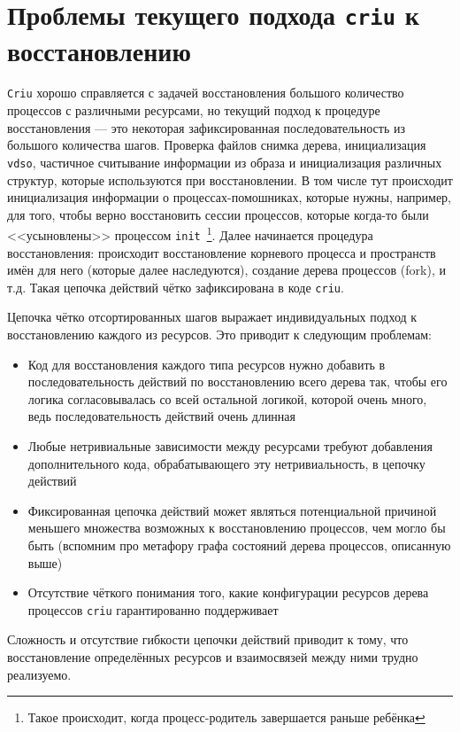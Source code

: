 \section{Проблемы текущего подхода \texttt{criu} к восстановлению}
\label{chap1:sec:problems}

\texttt{Criu} хорошо справляется с задачей восстановления большого количество процессов с различными ресурсами, но
текущий подход к процедуре восстановления --- это некоторая зафиксированная последовательность из большого количества шагов. Проверка файлов снимка дерева, инициализация \texttt{vdso}, частичное считывание информации из образа и инициализация различных структур, которые используются при восстановлении. В том числе тут происходит инициализация информации о процессах-помошниках, которые нужны, например, для того, чтобы верно восстановить сессии процессов, которые когда-то были <<усыновлены>> процессом \texttt{init}~\footnote{Такое происходит, когда процесс-родитель завершается раньше ребёнка}. Далее начинается процедура восстановления: происходит восстановление корневого процесса и пространств имён для него (которые далее наследуются), создание дерева процессов (fork), и т.д. Такая цепочка действий чётко зафиксирована в коде \texttt{criu}.

Цепочка чётко отсортированных шагов выражает индивидуальных подход к восстановлению каждого из ресурсов. Это приводит к следующим проблемам:

\begin{itemize}
	\item Код для восстановления каждого типа ресурсов нужно добавить в последовательность действий по восстановлению всего дерева так, чтобы его логика согласовывалась со всей остальной логикой, которой очень много, ведь последовательность действий очень длинная
	\item Любые нетривиальные зависимости между ресурсами требуют добавления дополнительного кода, обрабатывающего эту нетривиальность, в цепочку действий
	\item Фиксированная цепочка действий может являться потенциальной причиной меньшего множества возможных к восстановлению процессов, чем могло бы быть (вспомним про метафору графа состояний дерева процессов, описанную выше)
	\item Отсутствие чёткого понимания того, какие конфигурации ресурсов дерева процессов \texttt{criu} гарантированно поддерживает
\end{itemize}

Сложность и отсутствие гибкости цепочки действий приводит к тому, что восстановление определённых ресурсов и взаимосвязей между ними трудно реализуемо. 


